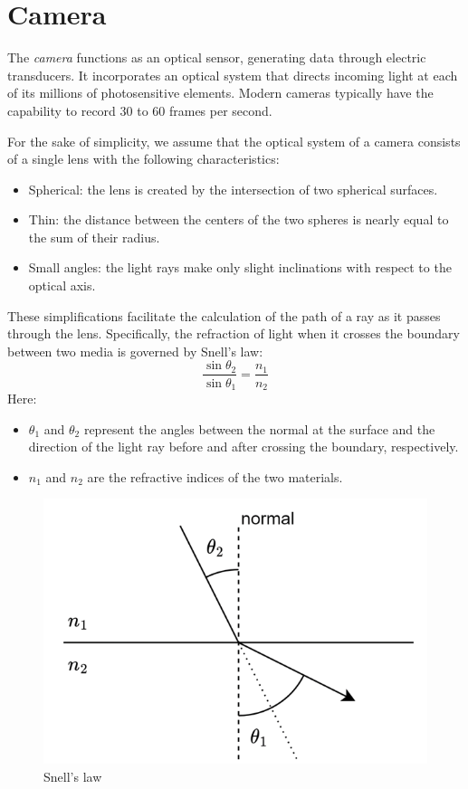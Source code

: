 \documentclass[12pt, a4paper]{report}
\begin{document}
    \section{Camera}
    \begin{definition}
    The \emph{camera} functions as an optical sensor, generating data through electric transducers. 
    It incorporates an optical system that directs incoming light at each of its millions of photosensitive elements. 
    Modern cameras typically have the capability to record 30 to 60 frames per second.
    \end{definition}
    For the sake of simplicity, we assume that the optical system of a camera consists of a single lens with the following characteristics:
    \begin{itemize}
        \item Spherical: the lens is created by the intersection of two spherical surfaces.
        \item Thin: the distance between the centers of the two spheres is nearly equal to the sum of their radius.
        \item Small angles: the light rays make only slight inclinations with respect to the optical axis.
    \end{itemize}
    These simplifications facilitate the calculation of the path of a ray as it passes through the lens.
    Specifically, the refraction of light when it crosses the boundary between two media is governed by Snell's law:
    \[\dfrac{\sin{\theta_2}}{\sin{\theta_1}}=\dfrac{n_1}{n_2}\]
    Here: 
    \begin{itemize}
        \item $\theta_1$ and $\theta_2$ represent the angles between the normal at the surface and the direction of the light ray before and after crossing the boundary, respectively.
        \item $n_1$ and $n_2$ are the refractive indices of the two materials.
    \end{itemize}
    \begin{figure}[H]
        \centering
        \includegraphics[width=0.4\linewidth]{images/refraction.png}
        \caption{Snell's law}
    \end{figure}
\end{document}
